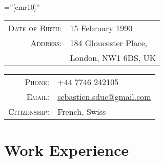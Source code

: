 \documentclass[a4paper,10pt]{article} %
\begin{document}
\pagestyle{empty} %

\font\fb=''[cmr10]'' %


\par{\par} %


\begin{tabular}{rl}
\textsc{Date of Birth:} & 15 February 1990 \\
\textsc{Address:} & 184 Gloucester Place,\\ 
                  & London, NW1 6DS, UK \\
\end{tabular}
\quad\quad\quad\quad\quad
\begin{tabular}{rl}
\textsc{Phone:} & +44 7746 242105\\
\textsc{Email:} & \href{mailto:sebastien.sduc@gmail.com}{sebastien.sduc@gmail.com}\\
\textsc{Citizenship:} & French, Swiss
\end{tabular}


\section{Work Experience}
\end{document}
